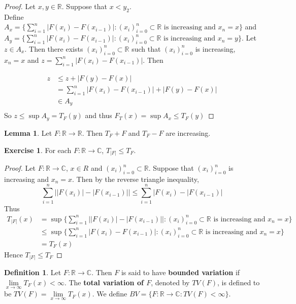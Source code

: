 \documentclass[12pt]{amsart}
\theoremstyle{definition}
\newtheorem{defn}[definition]{Definition}
\newtheorem{lem}[definition]{Lemma}
\newtheorem{ex}[definition]{Exercise}
\newcommand{\C}{\mathbb{C}}
\newcommand{\R}{\mathbb{R}}
\newcommand{\lex}[1]{\label{ex:#1}}
\newcommand{\ld}[1]{\label{defn:#1}}
\begin{document}
	\begin{proof}
		Let $x,y \in \R$. Suppose that $x<y_2$. \\Define  $A_x = \big \{\sum_{i=1}^{n}|F(x_{i}) - F(x_{i-1})|: (x_i)_{i=0}^n \subset \R \text{ is increasing and } x_n=x  \big \}$ and \\$A_y = \big \{\sum_{i=1}^{n}|F(x_{i}) - F(x_{i-1})|: (x_i)_{i=0}^n \subset \R \text{ is increasing and } x_n=y  \big \}$. Let $z \in A_x$. Then there exists $(x_i)_{i=0}^n \subset \R$ such that $(x_i)_{i=0}^n$ is increasing,\\ $x_n=x$ and $z = \sum_{i=1}^n |F(x_{i}) - F(x_{i-1})|$. Then
		
		\begin{align*}
			z 
			& \leq z+|F(y)-F(x)|\\
			&= \sum_{i=1}^n |F(x_{i}) - F(x_{i-1})| + |F(y)-F(x)|\\
			& \in A_y\\
		\end{align*} 
		So $z \leq \sup A_y = T_F(y) $ and thus $F_T(x)  = \sup A_x \leq T_F(y)$
	\end{proof}
	
	\begin{lem}
		Let $F:\R \rightarrow \R$. Then $T_F+F$ and $T_F-F$ are increasing.
	\end{lem}
	
	\begin{ex} \lex{00000} 
		For each $F:\R \rightarrow \C$, $T_{|F|} \leq T_F$.
	\end{ex}
	
	\begin{proof}
		Let $F:\R \rightarrow \C$, $x \in R$ and $(x_i)_{i=0}^n \subset \R$. Suppose that $(x_i)_{i=0}^n$ is increasing and $x_n=x$. Then by the reverse triangle inequality, $$ \sum_{i=1}^n\big||F(x_i)|-|F(x_{i-1})|\big|
		\leq \sum_{i=1}^n\big|F(x_i)-|F(x_{i-1})\big|$$
		Thus 
		\begin{align*}
			T_{|F|}(x) 
			&= \sup\bigg \{\sum_{i=1}^{n}\big||F(x_{i})| - |F(x_{i-1})|\big|: (x_i)_{i=0}^n \subset \R \text{ is increasing and } x_n=x  \bigg \} \\
			& \leq \sup\bigg \{\sum_{i=1}^{n}|F(x_{i}) - F(x_{i-1})|: (x_i)_{i=0}^n \subset \R \text{ is increasing and } x_n=x  \bigg \} \\
			&= T_F(x)
		\end{align*}
		Hence $T_{|F|} \leq T_F$
	\end{proof}
	
	\begin{defn} \ld{00000} 
		Let $F:\R \rightarrow \C$. Then $F$ is said to have \textbf{bounded variation} if $\lim \limits_{x \rightarrow \infty}T_F(x)<\infty$. The \textbf{total variation of $F$}, denoted by $TV(F)$, is defined to be $TV(F) = \lim\limits_{x\rightarrow \infty}T_F(x)$.
		We define $BV = \{F:\R \rightarrow \C: TV(F)<\infty \}$.
	\end{defn}
	
\end{document}
